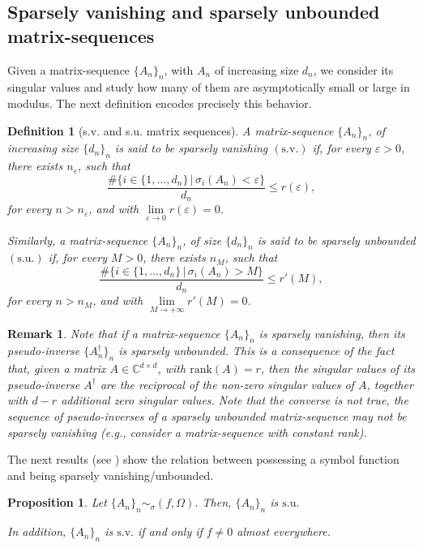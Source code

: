 \documentclass{amsart}
\newtheorem{prop}[thm]{Proposition}
\newtheorem{defn}[thm]{Definition}
\newtheorem{rem}[thm]{Remark}
\begin{document}
\subsection{Sparsely vanishing and sparsely unbounded matrix-sequences}
Given a matrix-sequence $\{A_n\}_n$, with $A_n$ of increasing size $d_n$, we consider its singular values and study how many of them are asymptotically small or large in modulus. The next definition encodes precisely this behavior.
\begin{defn}[s.v. and s.u. matrix sequences]
    A matrix-sequence $\{A_n\}_n$, of increasing size $\{d_n\}_n$ is said to be sparsely vanishing $\mathrm{(s.v.)}$ if, for every $\varepsilon>0$, there exists $n_\varepsilon$, such that
    \begin{equation*}
        \frac{\#\{i\in\{1,\ldots,d_n\}\,\vert\,\sigma_i(A_n)<\varepsilon\}}{d_n}\leq r(\varepsilon),
    \end{equation*}
    for every $n>n_\varepsilon$, and with $\lim\limits_{\varepsilon\to 0}r(\varepsilon)=0$.
    
    Similarly, a matrix-sequence $\{A_n\}_n$, of size $\{d_n\}_n$ is said to be sparsely unbounded $\mathrm{(s.u.)}$
    if, for every $M>0$, there exists $n_M$, such that
    \begin{equation*}
        \frac{\#\{i\in\{1,\ldots,d_n\}\,\vert\,\sigma_i(A_n)>M\}}{d_n}\leq r'(M),
    \end{equation*}
    for every $n>n_M$, and with $\lim\limits_{M\to +\infty}r'(M)=0$.
\end{defn}
\begin{rem}\label{rem_sv_su}
    Note that if a matrix-sequence $\{A_n\}_n$ is sparsely vanishing, then its pseudo-inverse $\{A_n^\dagger\}_n$ is sparsely unbounded. This is a consequence of the fact that, given a matrix $A\in\mathbb{C}^{d\times d}$, with $\mathrm{rank}(A)=r$, then the singular values of its pseudo-inverse $A^\dagger$ are the reciprocal of the non-zero singular values of $A$, together with $d-r$ additional zero singular values. Note that the converse is not true, the sequence of pseudo-inverses of a sparsely unbounded matrix-sequence may not be sparsely vanishing (e.g., consider a matrix-sequence with constant rank). 
\end{rem}
The next results (see \cite[Proposition 5.4 - Proposition 8.4]{glt-book-1}) show the relation between possessing a symbol function and being sparsely vanishing/unbounded.
\begin{prop}\label{sv_neq_zero_a_e}
    Let $\{A_n\}_n\sim_\sigma(f,\Omega)$. Then, $\{A_n\}_n$ is $\mathrm{s.u.}$ 
    
    In addition, $\{A_n\}_n$ is $\mathrm{s.v.}$ if and only if $f\neq 0$ almost everywhere. 
\end{prop}
\end{document}
